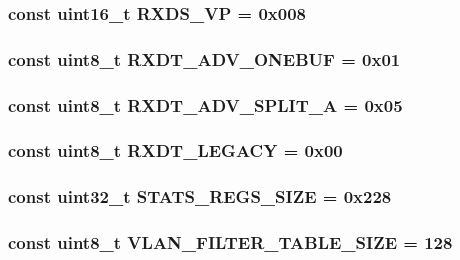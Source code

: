 \label{namespaceiGbReg_a8ba647bd48d3efd4636a1aad66243bbe}
\hypertarget{namespaceiGbReg_a4852770fe6f6c4babbbb589ef2038f16}{
\subsubsection[{RXDS\_\-VP}]{\setlength{\rightskip}{0pt plus 5cm}const uint16\_\-t {\bf RXDS\_\-VP} = 0x008}}
\label{namespaceiGbReg_a4852770fe6f6c4babbbb589ef2038f16}
\hypertarget{namespaceiGbReg_ad3aad4627ec1e57dbc49e8ddf0e8c10b}{
\subsubsection[{RXDT\_\-ADV\_\-ONEBUF}]{\setlength{\rightskip}{0pt plus 5cm}const uint8\_\-t {\bf RXDT\_\-ADV\_\-ONEBUF} = 0x01}}
\label{namespaceiGbReg_ad3aad4627ec1e57dbc49e8ddf0e8c10b}
\hypertarget{namespaceiGbReg_a86ad221aa778dcbb0f9c59fbdd29b652}{
\subsubsection[{RXDT\_\-ADV\_\-SPLIT\_\-A}]{\setlength{\rightskip}{0pt plus 5cm}const uint8\_\-t {\bf RXDT\_\-ADV\_\-SPLIT\_\-A} = 0x05}}
\label{namespaceiGbReg_a86ad221aa778dcbb0f9c59fbdd29b652}
\hypertarget{namespaceiGbReg_a6497536d5f701baf5ec692cd5f543c7b}{
\subsubsection[{RXDT\_\-LEGACY}]{\setlength{\rightskip}{0pt plus 5cm}const uint8\_\-t {\bf RXDT\_\-LEGACY} = 0x00}}
\label{namespaceiGbReg_a6497536d5f701baf5ec692cd5f543c7b}
\hypertarget{namespaceiGbReg_afe2d5a9d5db647d74a2be5dda7a68a4e}{
\subsubsection[{STATS\_\-REGS\_\-SIZE}]{\setlength{\rightskip}{0pt plus 5cm}const {\bf uint32\_\-t} {\bf STATS\_\-REGS\_\-SIZE} = 0x228}}
\label{namespaceiGbReg_afe2d5a9d5db647d74a2be5dda7a68a4e}
\hypertarget{namespaceiGbReg_a9678c7045c653e90c096e22638cd9b56}{
\subsubsection[{VLAN\_\-FILTER\_\-TABLE\_\-SIZE}]{\setlength{\rightskip}{0pt plus 5cm}const uint8\_\-t {\bf VLAN\_\-FILTER\_\-TABLE\_\-SIZE} = 128}}
\label{namespaceiGbReg_a9678c7045c653e90c096e22638cd9b56}
